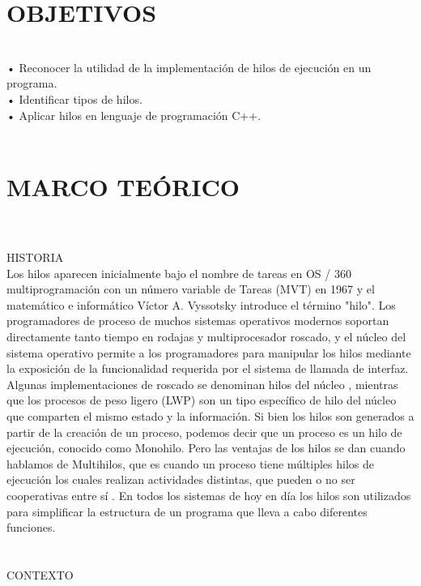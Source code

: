 \documentclass[conference]{IEEEtran}
\begin{document}
\section{OBJETIVOS}
\\
• Reconocer la utilidad de la implementación de hilos de ejecución en un programa.
\\
• Identificar tipos de hilos.
\\
• Aplicar hilos en lenguaje de programación C++.
\\
\\
\section{MARCO TEÓRICO}
\\
\\
HISTORIA
\\
Los hilos aparecen inicialmente bajo el nombre de tareas en OS / 360 multiprogramación con un número variable de Tareas (MVT) en 1967 y el matemático e informático Víctor A. Vyssotsky introduce el término "hilo". 
Los programadores de proceso de muchos sistemas operativos modernos soportan directamente tanto tiempo en rodajas y multiprocesador roscado, y el núcleo del sistema operativo permite a los programadores para manipular los hilos mediante la exposición de la funcionalidad requerida por el sistema de llamada de interfaz. Algunas implementaciones de roscado se denominan hilos del núcleo , mientras que los procesos de peso ligero (LWP) son un tipo específico de hilo del núcleo que comparten el mismo estado y la información. 
Si bien los hilos son generados a partir de la creación de un proceso, podemos decir que un proceso es un hilo de ejecución, conocido como Monohilo. Pero las ventajas de los hilos se dan cuando hablamos de Multihilos, que es cuando un proceso tiene múltiples hilos de ejecución los cuales realizan actividades distintas, que pueden o no ser cooperativas entre sí \cite{b1}.
En todos los  sistemas de hoy en día los hilos son utilizados para simplificar la estructura de un programa que lleva a cabo diferentes funciones.
\\
\\
\\
CONTEXTO
\\
\end{document}
